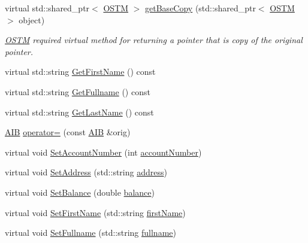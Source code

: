 \begin{DoxyCompactItemize}
\item 
virtual std\+::shared\+\_\+ptr$<$ \hyperlink{class_o_s_t_m}{O\+S\+TM} $>$ \hyperlink{class_a_i_b_a987107f3d7a04790f84c1e7eeee37575_a987107f3d7a04790f84c1e7eeee37575}{get\+Base\+Copy} (std\+::shared\+\_\+ptr$<$ \hyperlink{class_o_s_t_m}{O\+S\+TM} $>$ object)
\begin{DoxyCompactList}\small\item\em \hyperlink{class_o_s_t_m}{O\+S\+TM} required virtual method for returning a pointer that is copy of the original pointer. \end{DoxyCompactList}\item 
virtual std\+::string \hyperlink{class_a_i_b_aa0833919c1c211481560cd88cb5b381b_aa0833919c1c211481560cd88cb5b381b}{Get\+First\+Name} () const 
\item 
virtual std\+::string \hyperlink{class_a_i_b_a4fbad1d62d84d47e78b2b7065be14942_a4fbad1d62d84d47e78b2b7065be14942}{Get\+Fullname} () const 
\item 
virtual std\+::string \hyperlink{class_a_i_b_a1b09db7268734beeaf6a9e7e9d8feb02_a1b09db7268734beeaf6a9e7e9d8feb02}{Get\+Last\+Name} () const 
\item 
\hyperlink{class_a_i_b}{A\+IB} \hyperlink{class_a_i_b_a77b6f74ea3ef39cb1ccb916db7a48740_a77b6f74ea3ef39cb1ccb916db7a48740}{operator=} (const \hyperlink{class_a_i_b}{A\+IB} \&orig)
\item 
virtual void \hyperlink{class_a_i_b_ae582677d2d890f1728dedb9f43965df6_ae582677d2d890f1728dedb9f43965df6}{Set\+Account\+Number} (int \hyperlink{class_a_i_b_aafc08efeec5b8c800c32ee32f20603a7_aafc08efeec5b8c800c32ee32f20603a7}{account\+Number})
\item 
virtual void \hyperlink{class_a_i_b_ab5fd22fbbc0ea75a022aaeb7174fc450_ab5fd22fbbc0ea75a022aaeb7174fc450}{Set\+Address} (std\+::string \hyperlink{class_a_i_b_ae6a67cc33d1e5fa83a52a238e45ca3dc_ae6a67cc33d1e5fa83a52a238e45ca3dc}{address})
\item 
virtual void \hyperlink{class_a_i_b_ac286e13b8cf985bc88ce356b0eaada81_ac286e13b8cf985bc88ce356b0eaada81}{Set\+Balance} (double \hyperlink{class_a_i_b_a3c8d637bd997c1f062d844a88e2559ba_a3c8d637bd997c1f062d844a88e2559ba}{balance})
\item 
virtual void \hyperlink{class_a_i_b_a671e44bdbf1286d97d7a22295177dd2e_a671e44bdbf1286d97d7a22295177dd2e}{Set\+First\+Name} (std\+::string \hyperlink{class_a_i_b_a869f72057cb63ebf0cfd257069e15c7c_a869f72057cb63ebf0cfd257069e15c7c}{first\+Name})
\item 
virtual void \hyperlink{class_a_i_b_a03def15426e627042951369ea18b97f6_a03def15426e627042951369ea18b97f6}{Set\+Fullname} (std\+::string \hyperlink{class_a_i_b_a818b0cc283af23127c067fb3fc751058_a818b0cc283af23127c067fb3fc751058}{fullname})

\end{DoxyCompactItemize}
